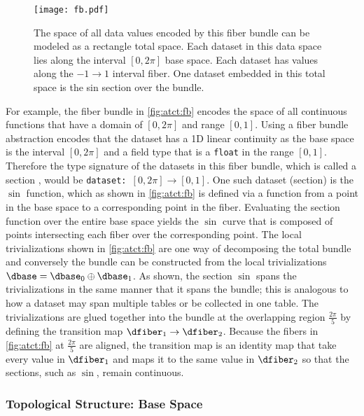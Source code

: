 \documentclass[journal]{IEEEtran}
\theoremstyle{definition}
\theoremstyle{remark}
\begin{document}
\begin{figure}[!h]
       \texttt{[image: fb.pdf]}
       \caption{The space of all data values encoded by this fiber bundle can be modeled as a \textcolor{total}{rectangle} total space. Each dataset in this data space lies along the interval \textcolor{base}{$[0,2\pi]$} base space. Each dataset has values along the \textcolor{fiber}{$-1 \rightarrow 1$} interval fiber. One dataset embedded in this total space is the \textcolor{section}{sin} section over the bundle.}\label{fig:atct:fb}
  \end{figure}


For example, the fiber bundle in \autoref{fig:atct:fb} encodes the space of all continuous functions that have a domain of $[0, 2\pi]$ and range $[0,1]$. Using a fiber bundle abstraction encodes that the dataset has a 1D linear continuity as the base space \dbase is the interval $[0,2\pi]$ and a field type that is a \texttt{float} in the range $[0,1]$. Therefore the type signature of the datasets in this fiber bundle, which is called a section \dsection, would be \texttt{dataset: $[0, 2\pi] \rightarrow [0,1]$}. One such dataset (section) is the $\sin$ function, which as shown in \autoref{fig:atct:fb} is defined via a function \dsection from a point in the base space to a corresponding point in the fiber. Evaluating the section function over the entire base space yields the $\sin$ curve that is composed of points intersecting each fiber over the corresponding point. The local trivializations shown in \autoref{fig:atct:fb} are one way of decomposing the total bundle and conversely the bundle can be constructed from the local trivializations $\dbase = \dbase_{0} \oplus \dbase_{1}$. As shown, the section $\sin$ spans the trivializations in the same manner that it spans the bundle; this is analogous to how a dataset may span multiple tables or be collected in one table. The trivializations are glued together into the bundle at the overlapping region $\frac{2\pi}{5}$ by defining the transition map $\dfiber_{1} \rightarrow \dfiber_{2}$. Because the fibers in \autoref{fig:atct:fb} at $\frac{2\pi}{5}$ are aligned, the transition map is an identity map that take every value in $\dfiber_1$ and maps it to the same value in $\dfiber_2$ so that the sections, such as $\sin$, remain continuous.


\subsubsection{\textcolor{base}{Topological Structure: Base Space \dbase}}
\label{sec:atct:fb:base}
\end{document}

